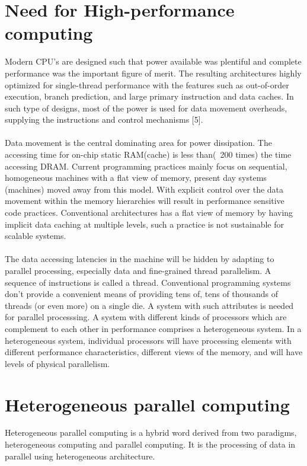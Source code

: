 \section{Need for High-performance computing}
Modern CPU's are designed such that power available was plentiful and complete performance was the important figure of merit. The resulting architectures highly optimized for single-thread performance with the features such as out-of-order execution, branch prediction, and large primary instruction and data caches. In such type of designs, most of the power is used for data movement overheads, supplying the instructions and control mechanisms [5].\paragraph*{} Data movement is the central dominating area for power dissipation. The accessing time for on-chip static RAM(cache) is less than(~200 times) the time accessing DRAM. Current programming practices mainly focus on sequential, homogeneous machines with a flat view of memory, present day systems (machines) moved away from this model. With explicit control over the data movement within the memory hierarchies will result in performance sensitive code practices. Conventional architectures has a flat view of memory by having implicit data caching at multiple levels, such a practice is not sustainable for scalable systems.
\paragraph*{} The data accessing latencies in the machine will be hidden by adapting to parallel processing, especially data and fine-grained thread parallelism. A sequence of instructions is called a thread. Conventional programming systems don't provide a convenient means of providing tens of, tens of thousands of threads (or even more) on a single die. A system with such attributes is needed for parallel processsing. A system with different kinds of processors which are complement to each other in performance comprises a heterogeneous system. In a heterogeneous system, individual processors will have processing elements with different performance characteristics, different views of the memory, and will have levels of physical parallelism.

\section{Heterogeneous parallel computing}
Heterogeneous parallel computing is a hybrid word derived from two paradigms, heterogeneous computing and parallel computing. It is the processing of data in parallel using heterogeneous architecture.
